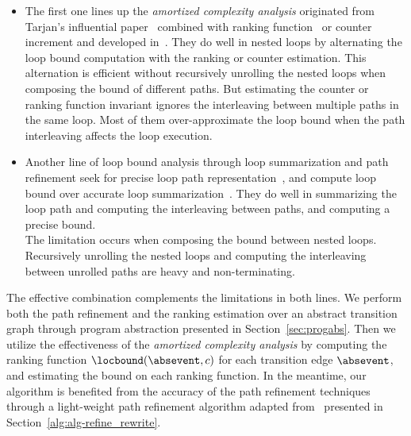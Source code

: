 \begin{itemize}
  \item The first one lines up the \emph{amortized complexity analysis} originated from Tarjan's influential paper~\cite{PotechinP17} combined with ranking function~\cite{BradleyMS05} or counter increment and developed in~\cite{ZulegerGSV11,SinnZV14,SinnZV17,LuCT21,AliasDFG10}.
  They do well in nested loops by alternating the loop bound computation with the ranking or counter estimation. This alternation is efficient without recursively unrolling the nested loops when composing the bound of different paths.
 But estimating the counter or ranking function invariant ignores the interleaving between multiple paths in the same loop.
Most of them over-approximate the loop bound when the path interleaving affects the loop execution.
  \item 
  Another line of loop bound analysis through loop summarization and path refinement seek for precise loop path representation~\cite{ManoliosV06,BalakrishnanSIG09,SharmaDDA11,Flores-MontoyaH14,HumenbergerJK18,CyphertBKR19}, and compute loop bound over accurate loop summarization~\cite{GulwaniJK09,ZulegerGSV11}.
  They do well in summarizing the loop path and computing the interleaving between paths, and computing a precise bound.
  \\
  The limitation occurs when composing the bound between nested loops. Recursively unrolling the nested loops and computing the interleaving between unrolled paths are heavy and non-terminating.
\end{itemize}
The effective combination complements the limitations in both lines. 
We perform both the path refinement and the ranking estimation over an abstract transition graph through program abstraction presented in Section~\ref{sec:progabs}.
Then we utilize the effectiveness of the \emph{amortized complexity analysis} by computing the ranking function $\locbound(\absevent, c)$ for each transition edge $\absevent$, and estimating the bound on each ranking function.
In the meantime, our algorithm is benefited from the accuracy of the path refinement techniques through a light-weight path refinement algorithm adapted from~\cite{GulwaniJK09} presented in Section~\ref{alg:alg-refine_rewrite}.

